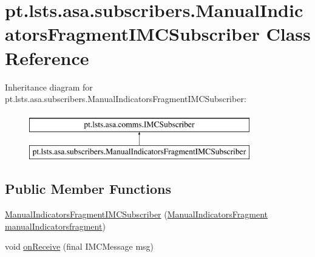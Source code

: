 \hypertarget{classpt_1_1lsts_1_1asa_1_1subscribers_1_1ManualIndicatorsFragmentIMCSubscriber}{}\section{pt.\+lsts.\+asa.\+subscribers.\+Manual\+Indicators\+Fragment\+I\+M\+C\+Subscriber Class Reference}
\label{classpt_1_1lsts_1_1asa_1_1subscribers_1_1ManualIndicatorsFragmentIMCSubscriber}
Inheritance diagram for pt.\+lsts.\+asa.\+subscribers.\+Manual\+Indicators\+Fragment\+I\+M\+C\+Subscriber\+:\begin{figure}[H]
\begin{center}
\leavevmode
\includegraphics[height=2.000000cm]{classpt_1_1lsts_1_1asa_1_1subscribers_1_1ManualIndicatorsFragmentIMCSubscriber}
\end{center}
\end{figure}
\subsection*{Public Member Functions}
\begin{DoxyCompactItemize}
\item 
\hyperlink{classpt_1_1lsts_1_1asa_1_1subscribers_1_1ManualIndicatorsFragmentIMCSubscriber_a15a9a2a4e04659d3f18c751aaee6d7a9}{Manual\+Indicators\+Fragment\+I\+M\+C\+Subscriber} (\hyperlink{classpt_1_1lsts_1_1asa_1_1fragments_1_1ManualIndicatorsFragment}{Manual\+Indicators\+Fragment} \hyperlink{classpt_1_1lsts_1_1asa_1_1subscribers_1_1ManualIndicatorsFragmentIMCSubscriber_aed562c78c365b11b8c6a12fbee977aa0}{manual\+Indicatorsfragment})
\item 
void \hyperlink{classpt_1_1lsts_1_1asa_1_1subscribers_1_1ManualIndicatorsFragmentIMCSubscriber_affd99d17821d61032a8822cf0433df2c}{on\+Receive} (final I\+M\+C\+Message msg)
\end{DoxyCompactItemize}
